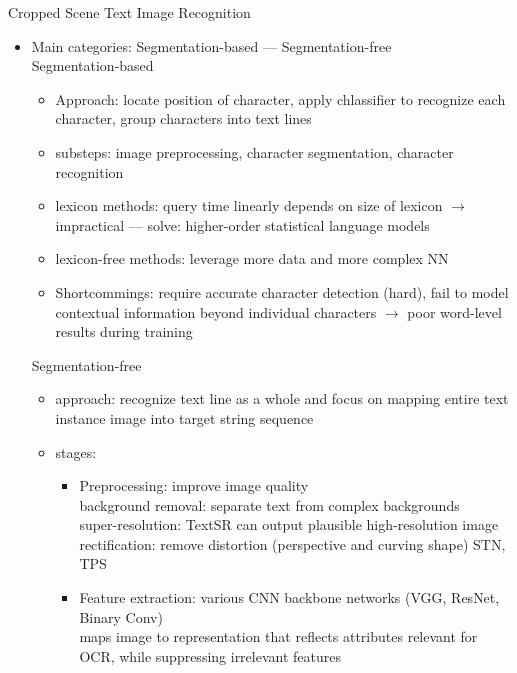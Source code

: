 Cropped Scene Text Image Recognition
\begin{itemize}
    \item Main categories: Segmentation-based --- Segmentation-free \\
        Segmentation-based
        \begin{itemize}
            \item Approach: locate position of character, apply chlassifier to recognize each character,
                group characters into text lines
            \item substeps: image preprocessing, character segmentation, character recognition
            \item lexicon methods: query time linearly depends on size of lexicon
                $\rightarrow$ impractical --- solve: higher-order statistical language models
            \item lexicon-free methods: leverage more data and more complex NN
            \item Shortcommings: require accurate character detection (hard), fail to model contextual
                information beyond individual characters $\rightarrow$ poor word-level results
                during training
        \end{itemize}
        Segmentation-free
        \begin{itemize}
            \item approach: recognize text line as a whole and focus on mapping entire text instance
                image into target string sequence
            \item stages:
                \begin{itemize}
                    \item Preprocessing: improve image quality\\
                        background removal: separate text from complex backgrounds\\
                        super-resolution: TextSR can output plausible high-resolution image\\
                        rectification: remove distortion (perspective and curving shape) STN, TPS
                    \item Feature extraction: various CNN backbone networks (VGG, ResNet, Binary Conv)\\
                        maps image to representation that reflects attributes relevant for OCR, while
                        suppressing irrelevant features\\

\end{itemize}
\end{itemize}
\end{itemize}
